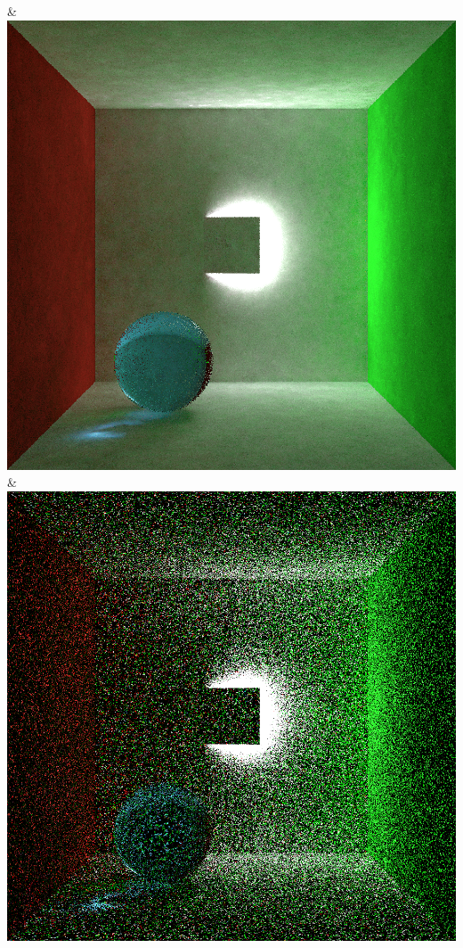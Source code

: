 & \includegraphics[width=\linewidth]{figures/py/tests/quality_comparison/nrc+sppc_1spp_ajar_caustic.png}
& \includegraphics[width=\linewidth]{figures/py/tests/quality_comparison/sppm_1spp_ajar_caustic.png}
